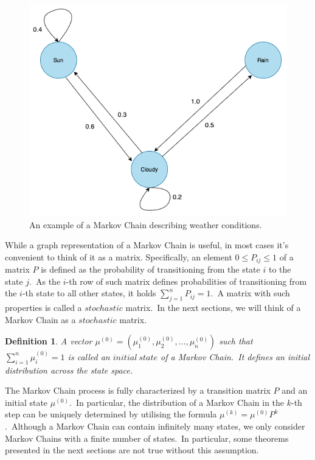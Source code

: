 \documentclass[a4paper, 11pt, onecolumn, openany, titlepage]{report}
\theoremstyle{default_theorem_style}\newtheorem{theorem}{Theorem}
\theoremstyle{default_theorem_style}\newtheorem{definition}{Definition}
\begin{document}
\hspace*{-1.5in}
\begin{figure}[H]
\centering
\includegraphics[scale=0.4]{markov_chain}
\caption{An example of a Markov Chain describing weather conditions.}
\label{fig:markov_chain}
\end{figure}
\hspace*{-1.5in}

While a graph representation of a Markov Chain is useful, in most cases it's convenient to think of it as a matrix.
Specifically, an element $0 \leq P_{ij} \leq 1$ of a matrix $P$ is defined as the probability of transitioning from
the state $i$ to the state $j$.\ As the $i$-th row of such matrix defines probabilities of transitioning from the
$i$-th  state to all other states, it holds $\sum_{j = 1}^{n} P_{ij} = 1$.\ A matrix with such properties is called a
$stochastic$ matrix.\ In the next sections, we will think of a Markov Chain as a $stochastic$ matrix.

\begin{definition}
A vector $\mu^{(0)} = (\mu^{(0)}_1, \mu^{(0)}_2, \dots, \mu^{(0)}_n)$ such that $\sum_{i=1}^{n} \mu^{(0)}_i = 1$
is called an $initial\ state$ of a Markov Chain.\ It defines an initial distribution across the state space.

\end{definition}

The Markov Chain process is fully characterized by a transition matrix $P$ and an initial state $\mu^{(0)}$.\ In
particular, the distribution of a Markov Chain in the $k$-th step can be uniquely determined by utilising the
formula $\mu^{(k)} = \mu^{(0)}P^k$.\ Although a Markov Chain can contain infinitely many states, we only consider
Markov Chains with a finite number of states.\ In particular, some theorems presented in the next sections
are not true without this assumption.\newline
\end{document}
